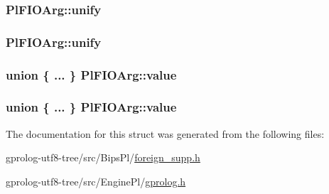 \subsubsection[{\texorpdfstring{unify}{unify}}]{ Pl\+F\+I\+O\+Arg\+::unify}\hypertarget{structPlFIOArg_a6394f30ef4d8a74b9a1e731a9f725a35}{}\label{structPlFIOArg_a6394f30ef4d8a74b9a1e731a9f725a35}
\subsubsection[{\texorpdfstring{unify}{unify}}]{ Pl\+F\+I\+O\+Arg\+::unify}\hypertarget{structPlFIOArg_a3d5c4af7de4d733aa3806b29081336b8}{}\label{structPlFIOArg_a3d5c4af7de4d733aa3806b29081336b8}
\subsubsection[{\texorpdfstring{value}{value}}]{\setlength{\rightskip}{0pt plus 5cm}union \{ ... \} 
   Pl\+F\+I\+O\+Arg\+::value}\hypertarget{structPlFIOArg_a69180a58f761dcda790af38c4c0ca5a2}{}\label{structPlFIOArg_a69180a58f761dcda790af38c4c0ca5a2}
\subsubsection[{\texorpdfstring{value}{value}}]{\setlength{\rightskip}{0pt plus 5cm}union \{ ... \} 
   Pl\+F\+I\+O\+Arg\+::value}\hypertarget{structPlFIOArg_a1588d26dbc95302b6b7a0b79715ead8e}{}\label{structPlFIOArg_a1588d26dbc95302b6b7a0b79715ead8e}


The documentation for this struct was generated from the following files\+:\begin{DoxyCompactItemize}
\item 
gprolog-\/utf8-\/tree/src/\+Bips\+Pl/\hyperlink{foreign__supp_8h}{foreign\+\_\+supp.\+h}\item 
gprolog-\/utf8-\/tree/src/\+Engine\+Pl/\hyperlink{gprolog_8h}{gprolog.\+h}\end{DoxyCompactItemize}
